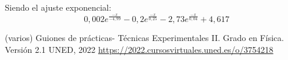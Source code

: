 \documentclass[a4paper,12pt,spanish]{article}
\begin{document}

Siendo el ajuste exponencial:
\[ 0,002 e^{\frac{-x}{-4,99}}-0,2e^{\frac{-x}{0,25}}-2,73 e^{\frac{-x}{0,04}}+4,617
\]





\begin{thebibliography}{1}
	
	
	 (varios) Guiones de prácticas- Técnicas Experimentales II. Grado en Física. Versión 2.1  UNED, 2022 \url{https://2022.cursosvirtuales.uned.es/o/3754218}
	
	
\end{thebibliography}
\end{document}

